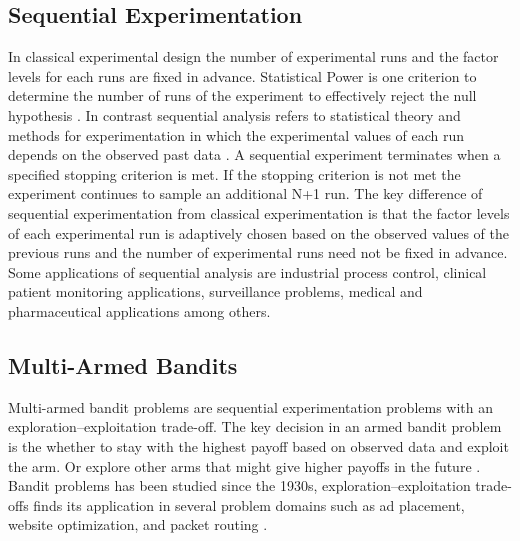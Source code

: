 \documentclass[letterpaper,11pt]{article}
\begin{document}
\subsection{Sequential Experimentation}
In classical experimental design the number of experimental runs and the factor levels for each runs are fixed in advance. Statistical Power is one criterion to determine the number of runs of the experiment to effectively reject the null hypothesis \cite{montgomery2017design}. In contrast sequential analysis refers to statistical theory and methods for experimentation in which the experimental values of each run depends on the observed past data \cite{johari2017peeking}. A sequential experiment terminates when a specified stopping criterion is met. If the stopping criterion is not met the experiment continues to sample an additional N+1 run. The key difference of sequential experimentation from classical experimentation is that the factor levels of each experimental run is adaptively chosen based on the observed values of the previous runs and the number of experimental runs need not be fixed in advance. Some applications of sequential analysis are industrial process control, clinical patient monitoring applications,  surveillance problems, medical and pharmaceutical applications among others.
\subsection{Multi-Armed Bandits}
Multi-armed bandit problems are sequential experimentation problems with an exploration–exploitation trade-off. The key decision in an armed bandit problem is the whether to stay with the highest payoff based on observed data and exploit the arm. Or explore other arms that might give higher payoffs in the future \cite{bubeck2012regret}. Bandit problems has been studied since the 1930s, exploration–exploitation trade-offs finds its application in several problem domains such as ad placement, website optimization, and packet routing \cite{bubeck2012regret}. 
\end{document}
